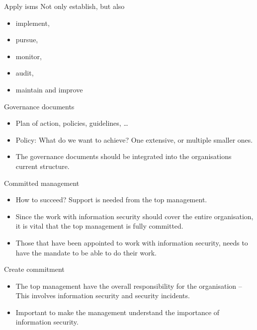 \documentclass{beamer}
\begin{document}
\begin{frame}{Apply \ac{isms}}
  Not only establish, but also
  \begin{itemize}
    \item implement,
    \item pursue,
    \item monitor,
    \item audit,
    \item maintain and improve
  \end{itemize}
\end{frame}

\begin{frame}{Governance documents}
  \begin{itemize}
    \item Plan of action, policies, guidelines, \dots
    \item Policy: What do we want to achieve?
      One extensive, or multiple smaller ones.
    \item The governance documents should be integrated into the organisations
      current structure.
  \end{itemize}
\end{frame}

\begin{frame}{Committed management}
  \begin{itemize}
    \item How to succeed?
      Support is needed from the top management.

    \item Since the work with information security should cover the entire
      organisation, it is vital that the top management is fully committed.

    \item Those that have been appointed to work with information security,
      needs to have the mandate to be able to do their work.

  \end{itemize}
\end{frame}

\begin{frame}{Create commitment}
  \begin{itemize}
    \item The top management have the overall responsibility for the
      organisation -- This involves information security and security incidents.
    \item Important to make the management understand the importance of
      information security.
  \end{itemize}
\end{frame}
\end{document}
